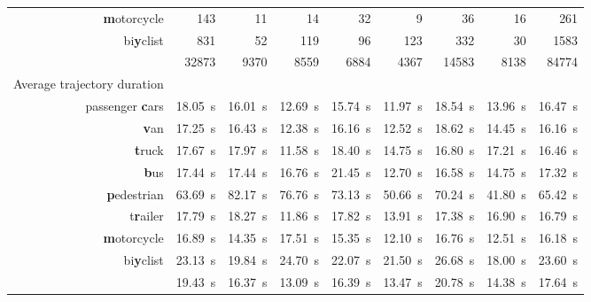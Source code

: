 \documentclass[a4paper, 10pt, conference]{ieeeconf}      %
\begin{document}
\begin{table}[t]
\begin{center}
\begin{tabular}{r|r|r|r|r|r|r|r||r}
                        \textbf{m}otorcycle & \SI{143}{} & \SI{11}{} & \SI{14}{} & \SI{32}{} & \SI{9}{} &  \SI{36}{} & \SI{16}{} & \SI{261}{} \\
            bi\textbf{y}clist & \SI{831}{} & \SI{52}{} & \SI{119}{} & \SI{96}{} & \SI{123}{} & \SI{332}{} & \SI{30}{} & \SI{1583}{} \\
                \hline
                            & \SI{32873}{} & \SI{9370}{} & \SI{8559}{} & \SI{6884}{} & \SI{4367}{} & \SI{14583}{} & \SI{8138}{} & \SI{84774}{} \\
                \hline \hline
    \multicolumn{1}{l|}{Average trajectory duration} & & & & & & & & \\
    passenger \textbf{c}ars & \SI{18,05}{\second} & \SI{16,01}{\second} & \SI{12,69}{\second} & \SI{15,74}{\second} & \SI{11,97}{\second} & \SI{18,54}{\second} & \SI{13,96}{\second} & \SI{16,47}{\second} \\
                \textbf{v}an & \SI{17,25}{\second} & \SI{16,43}{\second} & \SI{12,38}{\second} & \SI{16,16}{\second} & \SI{12,52}{\second} & \SI{18,62}{\second} & \SI{14,45}{\second} & \SI{16,16}{\second} \\
            \textbf{t}ruck & \SI{17,67}{\second} & \SI{17,97}{\second} & \SI{11,58}{\second} & \SI{18,40}{\second} & \SI{14,75}{\second} & \SI{16,80}{\second} & \SI{17,21}{\second} & \SI{16,46}{\second} \\
                \textbf{b}us & \SI{17,44}{\second} & \SI{17,44}{\second} & \SI{16,76}{\second} & \SI{21,45}{\second} & \SI{12,70}{\second} & \SI{16,58}{\second} & \SI{14,75}{\second} & \SI{17,32}{\second} \\
        \textbf{p}edestrian & \SI{63,69}{\second} & \SI{82,17}{\second} & \SI{76,76}{\second} & \SI{73,13}{\second} & \SI{50,66}{\second} & \SI{70,24}{\second} & \SI{41,80}{\second} & \SI{65,42}{\second} \\
            t\textbf{r}ailer & \SI{17,79}{\second} & \SI{18,27}{\second} & \SI{11,86}{\second} & \SI{17,82}{\second} & \SI{13,91}{\second} & \SI{17,38}{\second} & \SI{16,90}{\second} & \SI{16,79}{\second} \\
        \textbf{m}otorcycle & \SI{16,89}{\second} & \SI{14,35}{\second} & \SI{17,51}{\second} & \SI{15,35}{\second} & \SI{12,10}{\second} & \SI{16,76}{\second} & \SI{12,51}{\second} & \SI{16,18}{\second} \\
        bi\textbf{y}clist & \SI{23,13}{\second} & \SI{19,84}{\second} & \SI{24,70}{\second} & \SI{22,07}{\second} & \SI{21,50}{\second} & \SI{26,68}{\second} & \SI{18,00}{\second} & \SI{23,60}{\second} \\
    \hline
                            & \SI{19,43}{\second} & \SI{16,37}{\second} & \SI{13,09}{\second} & \SI{16,39}{\second} & \SI{13,47}{\second} & \SI{20,78}{\second} & \SI{14,38}{\second} & \SI{17,64}{\second} \\
    \hline
    \hline


\end{tabular}
\end{center}
\end{table}
\end{document}
